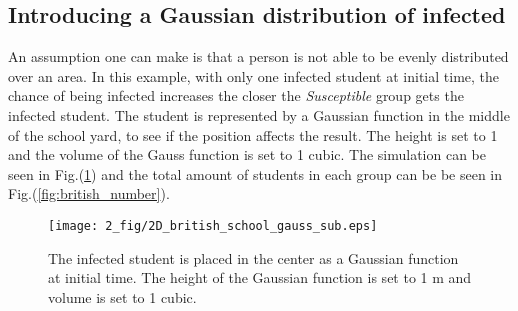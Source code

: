 \documentclass[%
twoside,                 %
final,                   %
chapterprefix=true,      %
open=right               %
10pt]{book}
\begin{document}
\subsection{Introducing a Gaussian distribution of infected}
An assumption one can make is that a person is not able to be evenly distributed over an area. In this example, with only one infected student at initial time, the chance of being infected increases the closer the \emph{Susceptible} group gets the infected student. The student is represented by a Gaussian function in the middle of the school yard, to see if the position affects the result. The height is set to 1 and the volume of the Gauss function is set to 1 cubic. The simulation can be seen in Fig.(\ref{fig:gauss_sub}) and the total amount of students in each group can be be seen in Fig.(\ref{fig:british_number}).


\begin{figure}[ht]
  \centerline{\texttt{[image: 2\_fig/2D\_british\_school\_gauss\_sub.eps]}}
  \caption{
  \label{fig:gauss_sub} The infected student is placed in the center as a Gaussian function at initial time. The height of the Gaussian function is set to 1 m and volume is set to 1 cubic.
  }
\end{figure}
\end{document}
